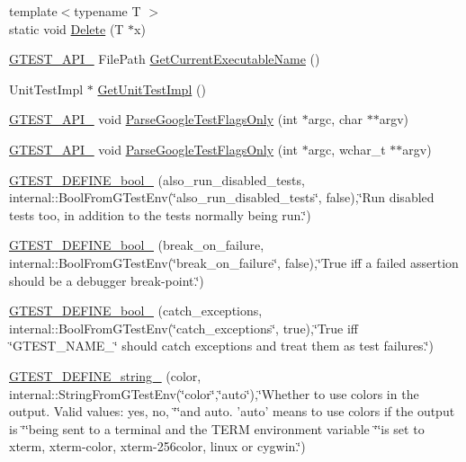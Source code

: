 \begin{DoxyCompactItemize}
\item 
{\footnotesize template$<$typename T $>$ }\\static void \hyperlink{namespacetesting_1_1internal_a9e0b8eb07b3eef24b40b4bbe03bd11be}{\-Delete} (\-T $\ast$x)
\item 
\hyperlink{gtest-port_8h_aa73be6f0ba4a7456180a94904ce17790}{\-G\-T\-E\-S\-T\-\_\-\-A\-P\-I\-\_\-} \-File\-Path \hyperlink{namespacetesting_1_1internal_a4fc348184f2bc16ec2270cffb38de5dc}{\-Get\-Current\-Executable\-Name} ()
\item 
\-Unit\-Test\-Impl $\ast$ \hyperlink{namespacetesting_1_1internal_a3ae874a4030c4aa27d77d67bf08d9e1d}{\-Get\-Unit\-Test\-Impl} ()
\item 
\hyperlink{gtest-port_8h_aa73be6f0ba4a7456180a94904ce17790}{\-G\-T\-E\-S\-T\-\_\-\-A\-P\-I\-\_\-} void \hyperlink{namespacetesting_1_1internal_a5655276556ac09c8d184920553da3e90}{\-Parse\-Google\-Test\-Flags\-Only} (int $\ast$argc, char $\ast$$\ast$argv)
\item 
\hyperlink{gtest-port_8h_aa73be6f0ba4a7456180a94904ce17790}{\-G\-T\-E\-S\-T\-\_\-\-A\-P\-I\-\_\-} void \hyperlink{namespacetesting_1_1internal_ae231639ccb18f92df31567b3eca47ac9}{\-Parse\-Google\-Test\-Flags\-Only} (int $\ast$argc, wchar\-\_\-t $\ast$$\ast$argv)
\item 
\hyperlink{namespacetesting_a531ff780002eba452569e9460c1ef9d0}{\-G\-T\-E\-S\-T\-\_\-\-D\-E\-F\-I\-N\-E\-\_\-bool\-\_\-} (also\-\_\-run\-\_\-disabled\-\_\-tests, internal\-::\-Bool\-From\-G\-Test\-Env(\char`\"{}also\-\_\-run\-\_\-disabled\-\_\-tests\char`\"{}, false),\char`\"{}\-Run disabled tests too, in addition to the tests normally being run.\char`\"{})
\item 
\hyperlink{namespacetesting_a0e26d20c87cb9c7eeeda10d6ac6721f3}{\-G\-T\-E\-S\-T\-\_\-\-D\-E\-F\-I\-N\-E\-\_\-bool\-\_\-} (break\-\_\-on\-\_\-failure, internal\-::\-Bool\-From\-G\-Test\-Env(\char`\"{}break\-\_\-on\-\_\-failure\char`\"{}, false),\char`\"{}\-True iff a failed assertion should be a debugger break-\/point.\char`\"{})
\item 
\hyperlink{namespacetesting_ad44717d223b0a534027184b6adb5c834}{\-G\-T\-E\-S\-T\-\_\-\-D\-E\-F\-I\-N\-E\-\_\-bool\-\_\-} (catch\-\_\-exceptions, internal\-::\-Bool\-From\-G\-Test\-Env(\char`\"{}catch\-\_\-exceptions\char`\"{}, true),\char`\"{}\-True iff \char`\"{}\-G\-T\-E\-S\-T\-\_\-\-N\-A\-M\-E\-\_\-\char`\"{} should catch exceptions and treat them as test failures.\char`\"{})
\item 
\hyperlink{namespacetesting_ab239ee3e29f0fe79791cdce90600cbc0}{\-G\-T\-E\-S\-T\-\_\-\-D\-E\-F\-I\-N\-E\-\_\-string\-\_\-} (color, internal\-::\-String\-From\-G\-Test\-Env(\char`\"{}color\char`\"{},\char`\"{}auto\char`\"{}),\char`\"{}\-Whether to use colors in the output.  \-Valid values\-: yes, no, \char`\"{}\char`\"{}and auto.  'auto' means to use colors if the output is \char`\"{}\char`\"{}being sent to a terminal and the \-T\-E\-R\-M environment variable \char`\"{}\char`\"{}is set to xterm, xterm-\/color, xterm-\/256color, linux or cygwin.\char`\"{})

\end{DoxyCompactItemize}
